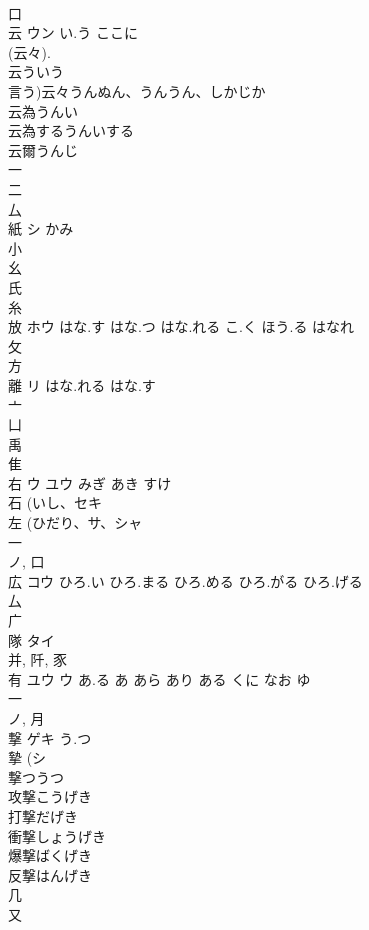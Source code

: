\documentclass[8pt]{extreport}
\begin{document}
\begin{CJK}{UTF8}{min}
\\	口 
\\	云	ウン	い.う ここに	
\\	(云々).
\\	云ういう
\\	言う)云々うんぬん、うんうん、しかじか
\\	云為うんい
\\	云為するうんいする
\\	云爾うんじ
\\	一 
\\	二 
\\	厶 
\\	紙	シ	かみ	
\\	小 
\\	幺 
\\	氏 
\\	糸 
\\	放	ホウ	はな.す はな.つ はな.れる こ.く ほう.る はなれ	
\\	攵 
\\	方 
\\	離	リ	はな.れる はな.す	
\\	亠 
\\	凵 
\\	禹 
\\	隹 
\\	右	ウ ユウ	みぎ あき すけ	
\\	石 (いし、セキ 
\\	左 (ひだり、サ、シャ 
\\	一 
\\	ノ, 口 
\\	広	コウ	ひろ.い ひろ.まる ひろ.める ひろ.がる ひろ.げる	
\\	厶 
\\	广 
\\	隊	タイ		
\\	并, 阡, 豕 
\\	有	ユウ ウ	あ.る あ あら あり ある くに なお ゆ	
\\	一 
\\	ノ, 月 
\\	撃	ゲキ	う.つ	
\\	摯 (シ 
\\	撃つうつ
\\	攻撃こうげき
\\	打撃だげき
\\	衝撃しょうげき
\\	爆撃ばくげき
\\	反撃はんげき
\\	几 
\\	又 

\end{CJK}
\end{document}

